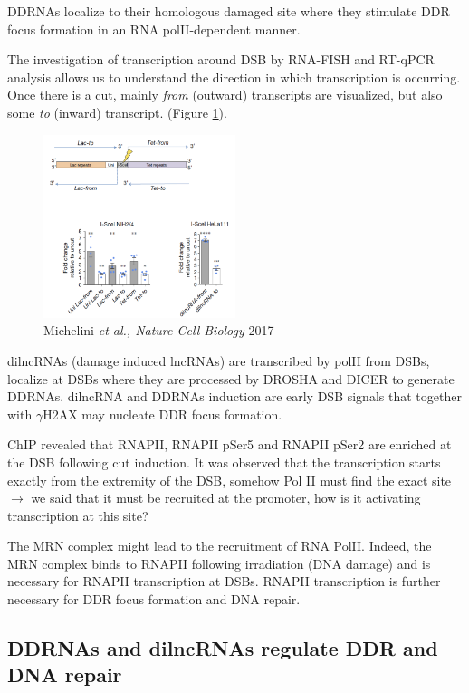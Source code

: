 DDRNAs localize to their homologous damaged site where they stimulate DDR focus formation in an RNA polII-dependent manner.

The investigation of transcription around DSB by RNA-FISH and RT-qPCR analysis allows us to understand the direction in which transcription is occurring. Once there is a cut, mainly \emph{from} (outward) transcripts are visualized, but also some \emph{to} (inward) transcript. (Figure \ref{fig:dd2}).

\begin{figure}
\centering
\includegraphics[width=0.5\textwidth]{Screen_Shot_2022-12-07_at_09-23-19.png}
\caption{Michelini \emph{et al., Nature Cell Biology} 2017}
\label{fig:dd2}
\end{figure}

dilncRNAs (damage induced lncRNAs) are transcribed by polII from DSBs, localize at DSBs where they are processed by DROSHA and DICER to generate DDRNAs. dilncRNA and DDRNAs induction are early DSB signals that together with \(\gamma\)H2AX may nucleate DDR focus formation.

ChIP revealed that RNAPII, RNAPII pSer5 and RNAPII pSer2 are enriched at the DSB following cut induction. It was observed that the transcription starts exactly from the extremity of the DSB, somehow Pol II must find the exact site $\rightarrow$ we said that it must be recruited at the promoter, how is it activating transcription at this site?

The MRN complex might lead to the recruitment of RNA PolII. Indeed, the MRN complex binds to RNAPII following irradiation (DNA damage) and is necessary for RNAPII transcription at DSBs. RNAPII transcription is further necessary for DDR focus formation and DNA repair.

\hypertarget{ddrnas-and-dilncrnas-regulate-ddr-and-dna-repair}{%
\subsection{DDRNAs and dilncRNAs regulate DDR and DNA repair}\label{ddrnas-and-dilncrnas-regulate-ddr-and-dna-repair}}

